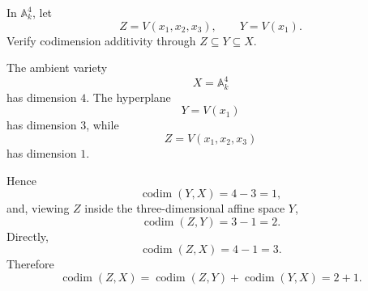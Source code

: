 \begin{problem}\label{prob:vi31-10}
In \(\mathbb A^4_k\), let
\[
Z=V(x_1,x_2,x_3),\qquad Y=V(x_1).
\]
Verify codimension additivity through \(Z\subseteq Y\subseteq X\).
\end{problem}

\ifdefined\FullProblemDossiers
\begin{solution}
The ambient variety
\[
X=\mathbb A^4_k
\]
has dimension \(4\). The hyperplane
\[
Y=V(x_1)
\]
has dimension \(3\), while
\[
Z=V(x_1,x_2,x_3)
\]
has dimension \(1\).

Hence
\[
\operatorname{codim}(Y,X)=4-3=1,
\]
and, viewing \(Z\) inside the three-dimensional affine space \(Y\),
\[
\operatorname{codim}(Z,Y)=3-1=2.
\]
Directly,
\[
\operatorname{codim}(Z,X)=4-1=3.
\]
Therefore
\[
\boxed{
\operatorname{codim}(Z,X)
=
\operatorname{codim}(Z,Y)+\operatorname{codim}(Y,X)
=
2+1.
}
\]
\end{solution}
\fi

